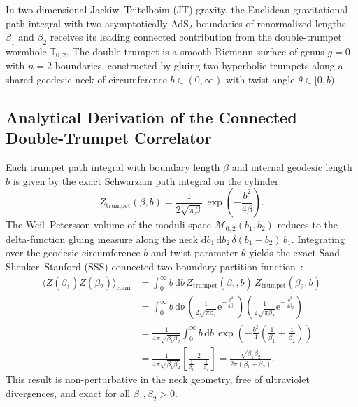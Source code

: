 \documentclass[11pt,a4paper,reqno]{article}
\theoremstyle{plain}
\theoremstyle{definition}
\theoremstyle{remark}
\numberwithin{equation}{section}
\providecommand{\diff}{\mathrm{d}}
\begin{document}
In two-dimensional Jackiw--Teitelboim (JT) gravity, the Euclidean gravitational path integral with two asymptotically AdS$_2$ boundaries of renormalized lengths $\beta_1$ and $\beta_2$ receives its leading connected contribution from the double-trumpet wormhole $\mathbb{T}_{0, 2}$. The double trumpet is a smooth Riemann surface of genus $g = 0$ with $n = 2$ boundaries, constructed by gluing two hyperbolic trumpets along a shared geodesic neck of circumference $b \in (0, \infty)$ with twist angle $\theta \in [0, b)$.

\subsection{Analytical Derivation of the Connected Double-Trumpet Correlator}
Each trumpet path integral with boundary length $\beta$ and internal geodesic length $b$ is given by the exact Schwarzian path integral on the cylinder:
\begin{equation}
  Z_{\mathrm{trumpet}}(\beta, b) = \frac{1}{2\sqrt{\pi \beta}} \, \exp\left( - \frac{b^2}{4\beta} \right).
  \label{eq:trumpet_kernel}
\end{equation}
The Weil--Petersson volume of the moduli space $\mathcal{M}_{0, 2}(b_1, b_2)$ reduces to the delta-function gluing measure along the neck $\diff b_1 \, \diff b_2 \, \delta(b_1 - b_2) \, b_1$. Integrating over the geodesic circumference $b$ and twist parameter $\theta$ yields the exact Saad--Shenker--Stanford (SSS) connected two-boundary partition function~\cite{SaadShenkerStanford2019}:
\begin{align}
  \langle Z(\beta_1) Z(\beta_2) \rangle_{\mathrm{conn}} &= \int_0^\infty b \, \diff b \, Z_{\mathrm{trumpet}}(\beta_1, b) \, Z_{\mathrm{trumpet}}(\beta_2, b) \nonumber \\
  &= \int_0^\infty b \, \diff b \, \left( \frac{1}{2\sqrt{\pi \beta_1}} \mathrm{e}^{-\frac{b^2}{4\beta_1}} \right) \left( \frac{1}{2\sqrt{\pi \beta_2}} \mathrm{e}^{-\frac{b^2}{4\beta_2}} \right) \nonumber \\
  &= \frac{1}{4\pi \sqrt{\beta_1 \beta_2}} \int_0^\infty b \, \diff b \, \exp\left( - \frac{b^2}{4} \left( \frac{1}{\beta_1} + \frac{1}{\beta_2} \right) \right) \nonumber \\
  &= \frac{1}{4\pi \sqrt{\beta_1 \beta_2}} \left[ \frac{2}{\frac{1}{\beta_1} + \frac{1}{\beta_2}} \right] = \frac{\sqrt{\beta_1 \beta_2}}{2\pi(\beta_1 + \beta_2)}.
  \label{eq:sss_double_trumpet_exact}
\end{align}
This result is non-perturbative in the neck geometry, free of ultraviolet divergences, and exact for all $\beta_1, \beta_2 > 0$.
\end{document}
